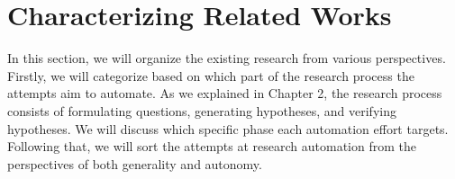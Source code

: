 
\section{Characterizing Related Works}
In this section, we will organize the existing research from various perspectives. Firstly, we will categorize based on which part of the research process the attempts aim to automate. As we explained in Chapter 2, the research process consists of formulating questions, generating hypotheses, and verifying hypotheses. We will discuss which specific phase each automation effort targets. Following that, we will sort the attempts at research automation from the perspectives of both generality and autonomy.






